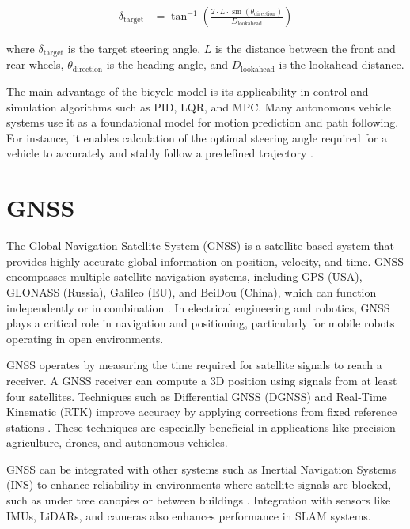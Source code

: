 \begin{equation}
	\begin{aligned}
		\delta_{\text{target}} &= \tan^{-1}\left( \frac{2 \cdot L \cdot \sin(\theta_{\text{direction}})}{D_{\text{lookahead}}} \right)
		\label{eq:bicycle_model_core}
	\end{aligned}		
\end{equation}

where \(\delta_{\text{target}}\) is the target steering angle, \(L\) is the distance between the front and rear wheels, \(\theta_{\text{direction}}\) is the heading angle, and \(D_{\text{lookahead}}\) is the lookahead distance.

\par
The main advantage of the bicycle model is its applicability in control and simulation algorithms such as PID, LQR, and MPC. Many autonomous vehicle systems use it as a foundational model for motion prediction and path following. For instance, it enables calculation of the optimal steering angle required for a vehicle to accurately and stably follow a predefined trajectory \cite{paden2016survey}.

\section{GNSS}
The Global Navigation Satellite System (GNSS) is a satellite-based system that provides highly accurate global information on position, velocity, and time. GNSS encompasses multiple satellite navigation systems, including GPS (USA), GLONASS (Russia), Galileo (EU), and BeiDou (China), which can function independently or in combination \cite{misra2006gps}. In electrical engineering and robotics, GNSS plays a critical role in navigation and positioning, particularly for mobile robots operating in open environments.

\par
GNSS operates by measuring the time required for satellite signals to reach a receiver. A GNSS receiver can compute a 3D position using signals from at least four satellites. Techniques such as Differential GNSS (DGNSS) and Real-Time Kinematic (RTK) improve accuracy by applying corrections from fixed reference stations \cite{kaplan2017understanding}. These techniques are especially beneficial in applications like precision agriculture, drones, and autonomous vehicles.

\par
GNSS can be integrated with other systems such as Inertial Navigation Systems (INS) to enhance reliability in environments where satellite signals are blocked, such as under tree canopies or between buildings \cite{grewal2013gnss}. Integration with sensors like IMUs, LiDARs, and cameras also enhances performance in SLAM systems.

